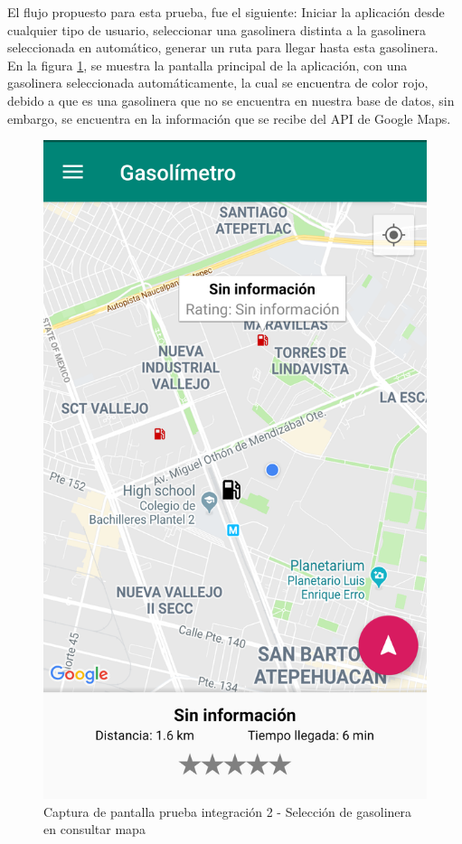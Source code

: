 El flujo propuesto para esta prueba, fue el siguiente: Iniciar la aplicación desde cualquier tipo de usuario, seleccionar una gasolinera distinta a la gasolinera seleccionada en automático, generar un ruta para llegar hasta esta gasolinera.\\

En la figura \ref{fig:int11}, se muestra la pantalla principal de la aplicación, con una gasolinera seleccionada automáticamente, la cual se encuentra de color rojo, debido a que es una gasolinera que no se encuentra en nuestra base de datos, sin embargo, se encuentra en la información que se recibe del API de Google Maps.

\begin{figure}[H]
	\centering
	\includegraphics[scale=.2]{DocumentoTecnico/Capitulo6/integracion/Software/images/11.png}
	\caption{Captura de pantalla prueba integración 2 - Selección de gasolinera en consultar mapa}
	\label{fig:int11}
\end{figure}


